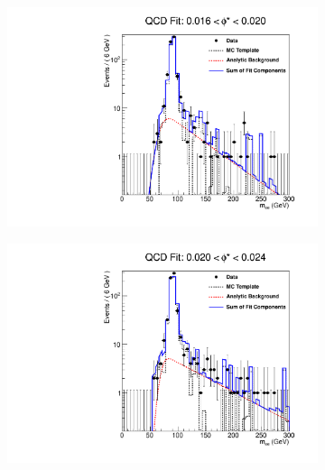 \begin{figure}[!htbp]
    \centering
    \begin{subfigure}[b]{\SideBySidePlotWidth}
        \includegraphics[width=\linewidth]{figures/qcd_fits/qcd_fit_plot_for_05.pdf}
        \label{fig:qcd_fit_05}
    \end{subfigure}%
    \begin{subfigure}[b]{\SideBySidePlotWidth}
        \includegraphics[width=\linewidth]{figures/qcd_fits/qcd_fit_plot_for_06.pdf}
        \label{fig:qcd_fit_06}
    \end{subfigure}
    \begin{subfigure}[b]{\SideBySidePlotWidth}

\end{subfigure}
\end{figure}
